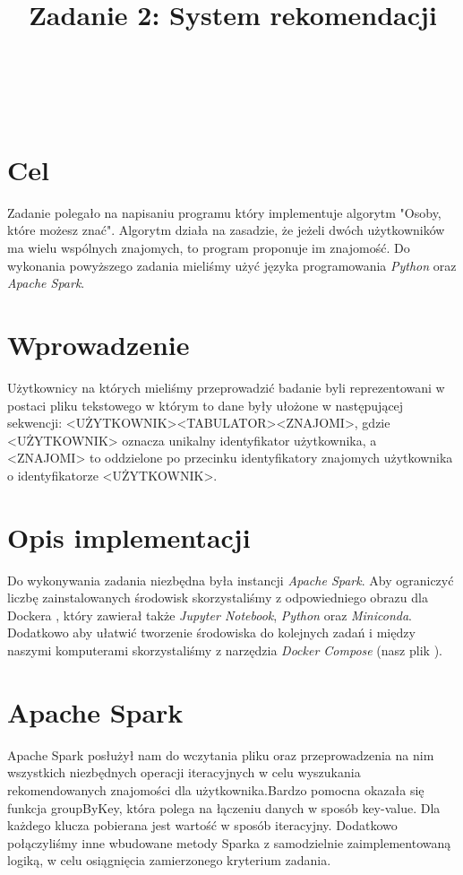 \documentclass{classrep}
\author{%
\\
  \studentinfo[234128@edu.p.lodz.pl]{Piotr Wardęcki}{234128}\\
  \studentinfo[234053@edu.p.lodz.pl]{Paweł Galewicz}{234053}\\
  \studentinfo[234067@edu.p.lodz.pl]{Bartosz Jurczewski}{234067}%
}
\title{Zadanie 2: System rekomendacji}
\begin{document}
\maketitle
\thispagestyle{fancyplain}
\clearpage

\section{Cel}
Zadanie polegało na napisaniu programu który implementuje algorytm "Osoby, które możesz znać". Algorytm działa na zasadzie, że jeżeli dwóch użytkowników ma wielu wspólnych znajomych, to program proponuje im znajomość. Do wykonania powyższego zadania mieliśmy użyć języka programowania \textit{Python} oraz \textit{Apache Spark}. 

\section{Wprowadzenie}
Użytkownicy na których mieliśmy przeprowadzić badanie byli reprezentowani w postaci pliku tekstowego w którym to dane były ułożone w następującej sekwencji: <UŻYTKOWNIK><TABULATOR><ZNAJOMI>, gdzie <UŻYTKOWNIK> oznacza unikalny identyfikator użytkownika, a <ZNAJOMI> to oddzielone po przecinku identyfikatory znajomych użytkownika o identyfikatorze <UŻYTKOWNIK>.


\section{Opis implementacji}
Do wykonywania zadania niezbędna była instancji \textit{Apache Spark}. Aby ograniczyć liczbę zainstalowanych środowisk skorzystaliśmy z odpowiedniego obrazu dla Dockera \cite{docker}, który zawierał także \textit{Jupyter Notebook}, \textit{Python} oraz \textit{Miniconda}. Dodatkowo aby ułatwić tworzenie środowiska do kolejnych zadań i między naszymi komputerami skorzystaliśmy z narzędzia \textit{Docker Compose} (nasz plik \cite{docker-compose}).

\section{Apache Spark}
Apache Spark posłużył nam do wczytania pliku oraz przeprowadzenia na nim wszystkich niezbędnych operacji iteracyjnych w celu wyszukania rekomendowanych znajomości dla użytkownika.Bardzo pomocna okazała się funkcja groupByKey, która polega na łączeniu danych w sposób key-value. Dla każdego klucza pobierana jest wartość w sposób iteracyjny. Dodatkowo połączyliśmy inne wbudowane metody Sparka z samodzielnie zaimplementowaną logiką, w celu osiągnięcia zamierzonego kryterium zadania.
\end{document}
